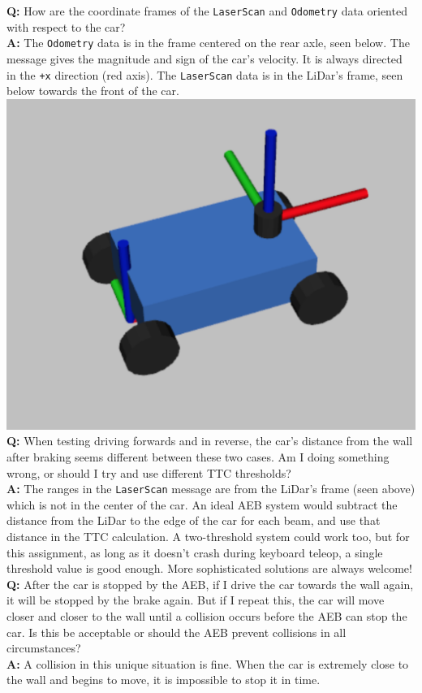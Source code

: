 \documentclass[letter]{article}
\begin{document}
\textbf{Q:} How are the coordinate frames of the \texttt{LaserScan} and \texttt{Odometry} data oriented with respect to the car?\\
\textbf{A:} The \texttt{Odometry} data is in the frame centered on the rear axle, seen below. The message gives the magnitude and sign of the car's 
velocity. It is always directed in the \texttt{+x} direction (red axis). The \texttt{LaserScan} data is in the LiDar's frame, seen below towards the front of the car.\\
\includegraphics[width = .5\textwidth]{car.png} \\

\textbf{Q:} When testing driving forwards and in reverse, the car's distance from the wall after braking seems different between these two cases. Am I doing something wrong, or should I try and use different TTC thresholds? \\
\textbf{A:} The ranges in the \texttt{LaserScan} message are from the LiDar's frame (seen above) which is not in the center of the car. An ideal AEB system would subtract the distance from the LiDar to the edge of the car for each beam, and use that distance in the TTC calculation. A two-threshold system could work too, but for this assignment, as long as it doesn't crash during keyboard teleop, a single threshold value is good enough. More sophisticated solutions are always welcome! \\

\textbf{Q:} After the car is stopped by the AEB, if I drive the car towards the wall again, it will be stopped by the brake again. But if I repeat this, the car will move closer and closer to the wall until a collision occurs before the AEB can stop the car. Is this be acceptable or should the AEB prevent collisions in all circumstances? \\
\textbf{A:} A collision in this unique situation is fine. When the car is extremely close to the wall and begins to move, it is impossible to stop it in time. \\
\end{document}
